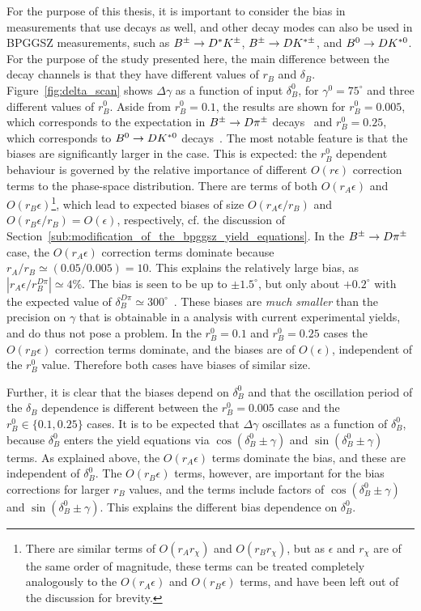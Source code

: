 For the purpose of this thesis, it is important to consider the bias in measurements that use \BtoDpi decays as well, and other \B decay modes can also be used in BPGGSZ measurements, such as ${{B}^\pm}\rightarrow{\ensuremath{{D}^*}}{\ensuremath{{K}^\pm}}$, ${{B}^\pm}\rightarrow{\ensuremath{D}}{\ensuremath{{K}^{*\pm}}}$, and ${{B}^0}\rightarrow{\ensuremath{D}}{\ensuremath{{K}^{*0}}}$. For the purpose of the study presented here, the main difference between the decay channels is that they have different values of $r_B$ and $\delta_B$. Figure~\ref{fig:delta_scan} shows $\Delta\gamma$ as a function of input $\delta_B^0$, for $\gamma^0=75^\circ$ and three different values of $r_B^0$. Aside from $r_B^0=0.1$, the results are shown for $r_B^0=0.005$, which corresponds to the expectation in ${{B}^\pm}\rightarrow{\ensuremath{D}}{\ensuremath{{\pi}^\pm}}$ decays~\cite{rDpi} and $r_B^0=0.25$, which corresponds to ${{B}^0}\rightarrow{\ensuremath{D}}{\ensuremath{{K}^{*0}}}$ decays~\cite{LHCb-CONF-2018-002}. The most notable feature is that the biases are significantly larger in the \BtoDpi case. This is expected: the $r^0_B$ dependent behaviour is governed by the relative importance of different $O(r\epsilon)$ correction terms to the phase-space distribution. There are terms of both $O(r_A\epsilon)$ and $O(r_B\epsilon)$\footnote{There are similar terms of $O(r_Ar_\chi)$ and $O(r_Br_\chi)$, but as $\epsilon$ and $r_\chi$ are of the same order of magnitude, these terms can be treated completely analogously to the $O(r_A\epsilon)$ and $O(r_B\epsilon)$ terms, and have been left out of the discussion for brevity.}, which lead to expected biases of size $O(r_A\epsilon/r_B)$ and $O(r_B\epsilon/r_B)=O(\epsilon)$, respectively, cf. the discussion of Section~\ref{sub:modification_of_the_bpggsz_yield_equations}. 
In the ${{B}^\pm}\rightarrow{\ensuremath{D}}{\ensuremath{{\pi}^\pm}}$ case, the $O(r_A\epsilon)$ correction terms dominate because $r_A/r_B\simeq (0.05/0.005)=10$. This explains the relatively large bias, as $|r_A\epsilon/r_B^{D\pi}|\simeq 4\%$. The bias is seen to be up to {}$\pm1.5^\circ$, but only about $+0.2^\circ$ with the expected value of $\delta_B^{D\pi}\simeq300^\circ$~\cite{LHCb-PAPER-2016-032,rDpi}. These biases are \emph{much smaller} than the precision on $\gamma$ that is obtainable in a \BtoDpi analysis with current experimental yields, and do thus not pose a problem.
In the $r_B^0=0.1$ and $r_B^0=0.25$ cases the $O(r_B\epsilon)$ correction terms dominate, and the biases are of $O(\epsilon)$, independent of the $r_B^0$ value. Therefore both cases have biases of similar size.



Further, it is clear that the biases depend on $\delta_B^0$ and that the oscillation period of the $\delta_B$ dependence is different between the $r^0_B=0.005$ case and the $r_B^0\in\{0.1, 0.25\}$ cases. It is to be expected that $\Delta\gamma$ oscillates as a function of $\delta^0_B$, because $\delta_B^0$ enters the yield equations via $\cos(\delta_B^0\pm\gamma)$ and $\sin(\delta_B^0\pm\gamma)$ terms.  As explained above, the $O(r_A\epsilon)$ terms dominate the \BtoDpi bias, and these are independent of $\delta_B^0$. The $O(r_B\epsilon)$ terms, however, are important for the bias corrections for larger $r_B$ values, and the terms include factors of $\cos(\delta_B^0\pm\gamma)$ and $\sin(\delta_B^0\pm\gamma)$. This explains the different bias dependence on $\delta^0_B$. 


